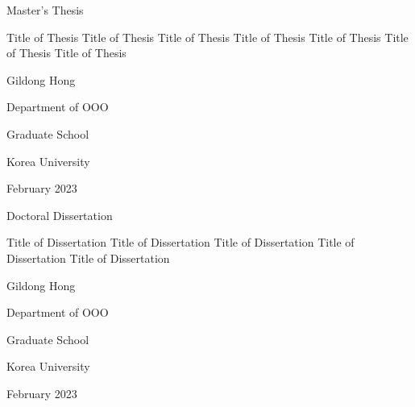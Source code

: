 \documentclass[11pt]{report}
\begin{document}

\newpage   
\begin{center}
{\fontsize{16pt}{16pt}\selectfont Master's Thesis \par}  
\vspace{3cm} %
\huge Title of Thesis Title of Thesis Title of Thesis Title of Thesis Title of Thesis  Title of Thesis  Title of Thesis
\par\vspace{4.5cm} %
{\fontsize{16pt}{16pt}\selectfont Gildong Hong \par}  %
\vspace{0.5cm}
{\fontsize{16pt}{16pt}\selectfont Department of OOO \par}  %
\vspace{1.5cm}
{\fontsize{18pt}{18pt}\selectfont Graduate School \par} 
\vspace{0.5cm}
{\fontsize{18pt}{18pt}\selectfont Korea University \par} 
\vspace{1cm}
{\fontsize{14pt}{14pt}\selectfont February 2023} 
\end{center}


\newpage 
\begin{center}
\noindent
{\fontsize{16pt}{16pt}\selectfont Doctoral Dissertation \par }  
\vspace{3cm} %
\huge Title of Dissertation Title of Dissertation Title of Dissertation Title of Dissertation Title of Dissertation 
\par\vspace{4.5cm} %
{\fontsize{16pt}{16pt}\selectfont Gildong Hong \par}
\vspace{0.5cm}
{\fontsize{16pt}{16pt}\selectfont Department of OOO \par} %
\vspace{1.5cm}
{\fontsize{18pt}{18pt}\selectfont Graduate School \par} 
\vspace{0.5cm}
{\fontsize{18pt}{18pt}\selectfont Korea University \par}
\vspace{1cm}
{\fontsize{14pt}{14pt}\selectfont February 2023} %
\end{center}
\end{document}
